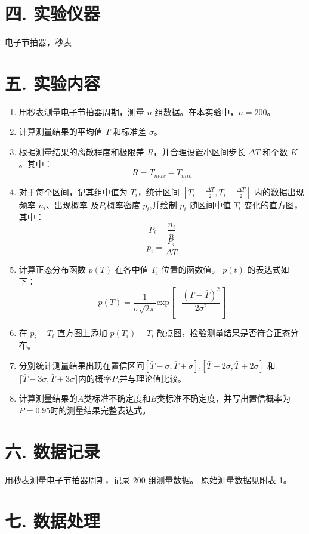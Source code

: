 \documentclass[12pt,a4paper]{article}
\begin{document}
	
	\section*{\textbf{{四. 实验仪器}}}
	电子节拍器，秒表

	\section*{\textbf{{五. 实验内容}}}


	\begin{enumerate}
		\item 用秒表测量电子节拍器周期，测量 $n$ 组数据。在本实验中，$n=200$。
		\item 计算测量结果的平均值 $\bar{T}$ 和标准差 $\sigma$。
		\item 根据测量结果的离散程度和极限差 $R$，并合理设置小区间步长 $\Delta T$ 和个数 $K$。其中：
		$$R=T_{max}-T_{min}$$
		\item 对于每个区间，记其组中值为 $T_i$，统计区间 $[T_i-\frac{\Delta T}2,T_i+\frac{\Delta T}2]$ 内的数据出现频率 $n_i$、出现概率 及$P_i$概率密度 $p_i$,并绘制 $p_i$ 随区间中值 $T_i$ 变化的直方图，其中：
		$$P_i=\dfrac{n_i}n$$
		$$p_i=\dfrac{P_i}{\Delta T}$$
		\item  计算正态分布函数 $p(T)$ 在各中值 $T_i$ 位置的函数值。 $p(t)$ 的表达式如下：
		$$p(T)=\dfrac{1}{\sigma\sqrt{2\pi}}\mathrm{exp}[-\dfrac{(T-\bar{T})^2}{2\sigma^2}]$$
		\item 在 $p_i - T_i$ 直方图上添加 $p(T_i) - T_i$ 散点图，检验测量结果是否符合正态分布。
		\item  分别统计测量结果出现在置信区间$[\bar{T}-\sigma,\bar{T}+\sigma]$,$[\bar{T}-2\sigma,\bar{T}+2\sigma]$ 和$\lceil\bar{T}-3\sigma,\bar{T}+3\sigma\rceil$内的概率$P$,并与理论值比较。
		\item 计算测量结果的$A$类标准不确定度和$B$类标准不确定度，并写出置信概率为$P=0.95$时的测量结果完整表达式。
	
	\end{enumerate}
	\section*{\textbf{{六. 数据记录}}}
	用秒表测量电子节拍器周期，记录 $200$ 组测量数据。
	原始测量数据见附表 1。

	\section*{\textbf{{七. 数据处理}}}
\end{document}
